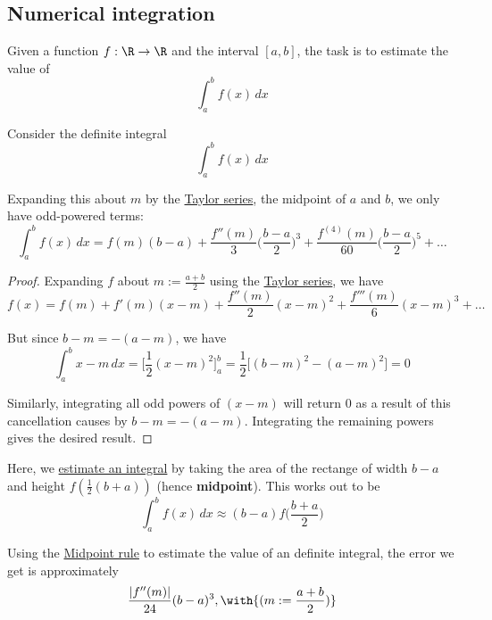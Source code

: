 \subsection{Numerical integration}\label{f792227}

\label{db6037a}

Given a function $f:\R\to\R$ and the interval $[a,b]$, the task is to estimate
the value of
$$
  \int_a^bf(x)\,dx
$$

\label{b024138}

Consider the definite integral
$$
  \int_a^bf(x)\,dx
$$

Expanding this about $m$ by the \href{ab7e885}{Taylor series}, the midpoint of
$a$ and $b$, we only have odd-powered terms:
$$
  \int_a^bf(x)\,dx=f(m)(b-a)+\frac{f''(m)}3\biggl(\frac{b-a}2\biggr)^3+\frac{f^{(4)}(m)}{60}\biggl(\frac{b-a}2\biggr)^5+\ldots
$$

\begin{proof}
  Expanding $f$ about $m:=\frac{a+b}2$ using the \href{ab7e885}{Taylor series},
  we have
  $$
    f(x)=f(m)+f'(m)(x-m)+\frac{f''(m)}{2}(x-m)^2+\frac{f'''(m)}{6}(x-m)^3+\ldots
  $$

  But since $b-m=-(a-m)$, we have
  $$
    \int_a^bx-m\,dx=\biggl[\frac12(x-m)^2\biggr]_a^b=\frac12\bigl[(b-m)^2-(a-m)^2\bigr]=0
  $$

  Similarly, integrating all odd powers of $(x-m)$ will return $0$ as a result
  of this cancellation causes by $b-m=-(a-m)$. Integrating the remaining powers
  gives the desired result.
\end{proof}

\label{adcfc4b}

Here, we \href{db6037a}{estimate an integral} by taking the area of the
rectange of width $b-a$ and height $f(\frac12(b+a))$ (hence \textbf{midpoint}).
This works out to be
$$
  \int_a^bf(x)\,dx\approx(b-a)f\biggl(\frac{b+a}{2}\biggr)
$$

\label{bdcd805}

Using the \href{adcfc4b}{Midpoint rule} to estimate the value of an definite
integral, the error we get is approximately
$$
  \frac{|f''(m)|}{24}(b-a)^3,\with{(m:=\frac{a+b}{2})}
$$


